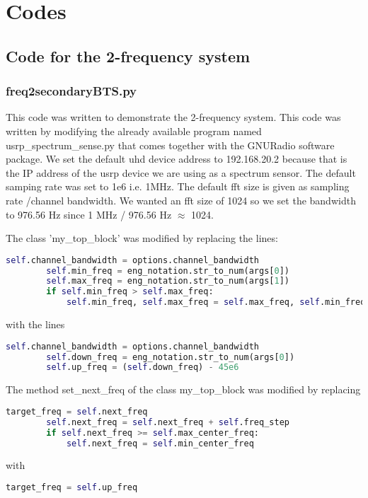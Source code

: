 \chapter{Codes}

\section{Code for the 2-frequency system}


\subsection{freq2secondaryBTS.py}

This code was written to demonstrate the 2-frequency system.
This code was written by modifying the already available program named 
\textsf{usrp\_spectrum\_sense.py} that comes together with the GNURadio software
package. We set the 
default \gls{uhd} device address to \textsf{192.168.20.2} because that is the IP address
of the \gls{usrp} device we are using as a spectrum sensor. The default samping rate
was set to 1e6 i.e. 1MHz. The default \gls{fft} size is given as
\textsf{sampling rate /channel bandwidth}. We wanted an \gls{fft} size of 1024 so we
set the bandwidth to
976.56 Hz since 1 MHz / 976.56 Hz $\approx$ 1024.

The class 'my\_top\_block' was modified by replacing the lines:
\begin{lstlisting}[language=Python]
        self.channel_bandwidth = options.channel_bandwidth
        self.min_freq = eng_notation.str_to_num(args[0])
        self.max_freq = eng_notation.str_to_num(args[1])
        if self.min_freq > self.max_freq:
            self.min_freq, self.max_freq = self.max_freq, self.min_freq    
\end{lstlisting}
with the lines
\begin{lstlisting}[language=Python]
        self.channel_bandwidth = options.channel_bandwidth
        self.down_freq = eng_notation.str_to_num(args[0])
        self.up_freq = (self.down_freq) - 45e6    
\end{lstlisting}

The method \textsf{set\_next\_freq} of the class \textsf{my\_top\_block} was modified by
replacing
\begin{lstlisting}[language=Python]
        target_freq = self.next_freq
        self.next_freq = self.next_freq + self.freq_step
        if self.next_freq >= self.max_center_freq:
            self.next_freq = self.min_center_freq
\end{lstlisting}
with
\begin{lstlisting}[language=Python]
        target_freq = self.up_freq
\end{lstlisting}




